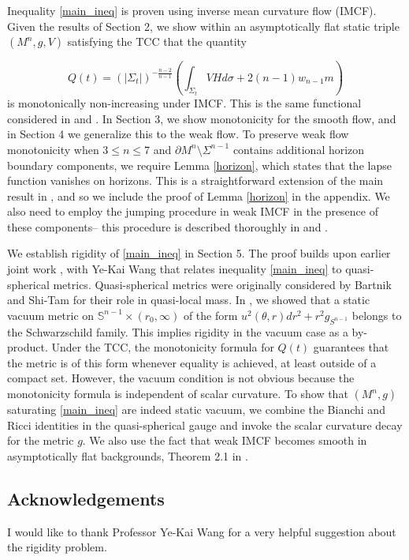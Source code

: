 \documentclass[12pt]{amsart}
\theoremstyle{definition}
\numberwithin{equation}{section}
\begin{document}
Inequality \eqref{main_ineq} is proven using inverse mean curvature flow (IMCF). Given the results of Section 2, we show within an asymptotically flat static triple $(M^{n},g,V)$ satisfying the TCC that the quantity 

\begin{equation*}
    Q(t)= \left( |\Sigma_{t}| \right)^{-\frac{n-2}{n-1}} \left( \int_{\Sigma_{t}} VH d\sigma + 2(n-1)w_{n-1} m \right)
\end{equation*}
is monotonically non-increasing under IMCF. This is the same functional considered in \cite{W18} and \cite{M18}. In Section 3, we show monotonicity for the smooth flow, and in Section 4 we generalize this to the weak flow. To preserve weak flow monotonicity when $3 \leq n \leq 7$ and $\partial M^{n} \setminus \Sigma^{n-1}$ contains additional horizon boundary components, we require Lemma \ref{horizon}, which states that the lapse function vanishes on horizons. This is a straightforward extension of the main result in \cite{HMM17}, and so we include the proof of Lemma \ref{horizon} in the appendix. We also need to employ the jumping procedure in weak IMCF in the presence of these components-- this procedure is described thoroughly in \cite{HI99} and \cite{W18}.

We establish rigidity of \eqref{main_ineq} in Section 5. The proof builds upon earlier joint work \cite{HW24}, \cite{HW24a} with Ye-Kai Wang that relates inequality \eqref{main_ineq} to quasi-spherical metrics. Quasi-spherical metrics were originally considered by Bartnik \cite{B93} and Shi-Tam \cite{ST02} for their role in quasi-local mass. In \cite{HW24a}, we showed that a static vacuum metric on $\mathbb{S}^{n-1} \times (r_{0},\infty)$ of the form $u^{2}(\theta,r) dr^{2} +r^{2} g_{S^{n-1}}$ belongs to the Schwarzschild family. This implies rigidity in the vacuum case as a by-product. Under the TCC, the monotonicity formula for $Q(t)$ guarantees that the metric is of this form whenever equality is achieved, at least outside of a compact set. However, the vacuum condition is not obvious because the monotonicity formula is independent of scalar curvature. To show that $(M^{n},g)$ saturating \eqref{main_ineq} are indeed static vacuum, we combine the Bianchi and Ricci identities in the quasi-spherical gauge and invoke the scalar curvature decay for the metric $g$. We also use the fact that weak IMCF becomes smooth in asymptotically flat backgrounds, Theorem 2.1 in \cite{HW24a}.
 
\subsection*{Acknowledgements} I would like to thank Professor Ye-Kai Wang for a very helpful suggestion about the rigidity problem.
\end{document}
